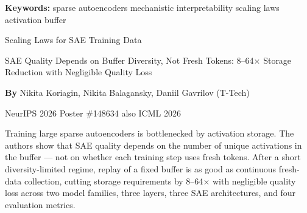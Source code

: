 \documentclass[10pt,twocolumn]{article}
\begin{document}
\setlength{\parindent}{0pt}
\setlength{\parskip}{4pt}

{\small\color{keywordgray}\textbf{Keywords:}
  sparse autoencoders \textbullet{}
  mechanistic interpretability \textbullet{}
  scaling laws \textbullet{}
  activation buffer}\par\vspace{4pt}

{\LARGE\bfseries\raggedright
  Scaling Laws for SAE Training Data}\par\vspace{4pt}

{\large\itshape\raggedright
  SAE Quality Depends on Buffer Diversity, Not Fresh Tokens: 8--64$\times$
  Storage Reduction with Negligible Quality Loss}\par\vspace{6pt}

{\small\textbf{By} Nikita Koriagin, Nikita Balagansky, Daniil Gavrilov
  (T-Tech)}\par\vspace{2pt}

{\small\color{keywordgray}NeurIPS 2026 Poster \#148634 \textbullet{}
  also ICML 2026}
\par\vspace{2pt}\noindent{\color{rulered}\rule{\columnwidth}{0.6pt}}\vspace{6pt}

Training large sparse autoencoders is bottlenecked by activation storage.
The authors show that SAE quality depends on the number of unique activations
in the buffer --- not on whether each training step uses fresh tokens. After
a short diversity-limited regime, replay of a fixed buffer is as good as
continuous fresh-data collection, cutting storage requirements by 8--64$\times$
with negligible quality loss across two model families, three layers,
three SAE architectures, and four evaluation metrics.
\end{document}
